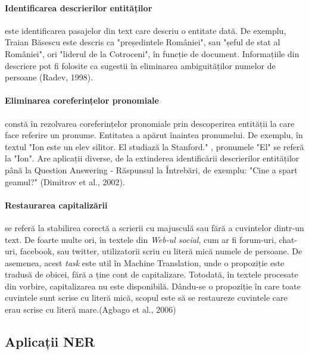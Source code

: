\paragraph{Identificarea descrierilor entităților}

este identificarea pasajelor din text care descriu o entitate dată. De exemplu, Traian Băsescu este descris ca "președintele României", sau "șeful de stat al României", ori "liderul de la Cotroceni", în funcție de document. Informațiile din descriere pot fi folosite ca sugestii în eliminarea ambiguităților numelor de persoane (Radev, 1998).\cite{Radev98learningcorrelations}

\paragraph{Eliminarea coreferințelor pronomiale}

constă în rezolvarea coreferințelor pronomiale prin descoperirea entității la care face referire un pronume. Entitatea a apărut înaintea pronumelui. De exemplu, în textul "Ion este un elev silitor. El studiază la Stanford." , pronumele "El" se referă la "Ion". Are aplicații diverse, de la extinderea identificării descrierilor entităților până la Question Answering - Răspunsul la Întrebări, de exemplu: "Cine a spart geamul?" (Dimitrov et al., 2002).\cite{Dimitrov02alight-weight}

\paragraph{Restaurarea capitalizării}

se referă la stabilirea corectă a scrierii cu majusculă sau fără a cuvintelor dintr-un text. De foarte multe ori, în textele din \textit{Web-ul social}, cum ar fi forum-uri, chat-uri, facebook, sau twitter, utilizatorii scriu cu literă mică numele de persoane. De asemenea, acest \textit{task} este util în Machine Translation, unde o propoziție este tradusă de obicei, fără a ține cont de capitalizare. Totodată, în textele procesate din vorbire, capitalizarea nu este disponibilă. Dându-se o propoziție în care toate cuvintele sunt scrise cu literă mică, scopul este să se restaureze cuvintele care erau scrise cu literă mare.(Agbago et al., 2006)\cite{Agbago06}


\pagebreak

\subsection{Aplicații NER}

